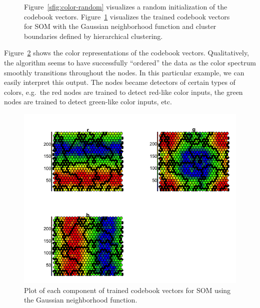 \begin{figure}[t]
\begin{subfigure}[b]{0.4\textwidth}
        \caption{}
        \label{sfig:color-gauss-code}
    \end{subfigure}
    \caption{Figure~\ref{sfig:color-random} visualizes 
        a random initialization of the codebook vectors.
        Figure~\ref{sfig:color-gauss-code}
        visualizes the trained codebook vectors for SOM with 
        the Gaussian neighborhood function and cluster boundaries
        defined by hierarchical clustering.}
    \label{fig:colors-codebook}
\end{figure}

Figure~\ref{fig:colors-codebook} shows the color representations of the codebook vectors. 
Qualitatively, the algorithm seems to have successfully ``ordered'' the data
as the color spectrum smoothly transitions throughout the nodes.
In this particular example, we can easily interpret this output.
The nodes became detectors of certain types of colors,
e.g.\ the red nodes are trained to detect red-like color inputs, 
the green nodes are trained to detect green-like color inputs, etc.

\begin{figure}[t]
    \centering
    \includegraphics[width=\textwidth]{../figs/Colors-Gaussian-8.png}
    \caption{}
    \label{fig:colors-gauss-feature}
    \caption{Plot of each component of trained codebook vectors for SOM using the Gaussian
            neighborhood function.}
\end{figure}


